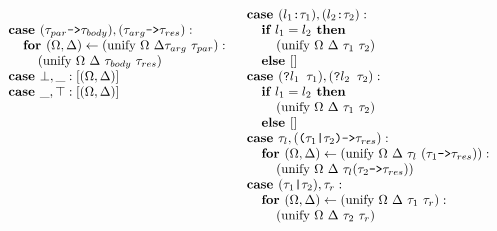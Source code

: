 \documentclass[acmsmall]{acmart}
\begin{document}
\begin{figure*}[h]
\[\begin{array}[t]{@{} l}
    \\

    \I \B{case } (\code{$\tau_{par}$->$\tau_{body}$}), (\code{$\tau_{arg}$->$\tau_{res}$}) : 
    \\
    \I\I \B{for } (\Omega, \Delta) \leftarrow (\F{unify } \Omega\ \Delta \tau_{arg}\ \tau_{par} ):
    \\
    \I\I\I (\F{unify } \Omega\ \Delta\ \tau_{body}\ \tau_{res})

    \\

    \I \B{case } \bot, \_ : [(\Omega, \Delta)]

    \\

    \I \B{case } \_, \top : [(\Omega, \Delta)]
\end{array}
\begin{array}[t]{@{} l}
    \I \B{case } (\code{$l_1$:$\tau_1$}), (\code{$l_2$:$\tau_2$}) :
    \\
    \I\I \B{if } l_1 = l_2 \B{ then }
    \\
    \I\I\I (\F{unify } \Omega\ \Delta\ \tau_1\ \tau_2)
    \\
    \I\I \B{else } []

    \\

    \I \B{case } (\code{?$l_1$ $\tau_1$}), (\code{?$l_2$ $\tau_2$}) :
    \\
    \I\I \B{if } l_1 = l_2 \B{ then }
    \\
    \I\I\I (\F{unify } \Omega\ \Delta\ \tau_1\ \tau_2)
    \\
    \I\I \B{else } []

    \\

    \I \B{case } \tau_l, (\code{($\tau_1$|$\tau_2$)->$\tau_{res}$}) : 
    \\
    \I\I \B{for } (\Omega, \Delta) \leftarrow (\F{unify } \Omega\ \Delta\ \tau_l\ (\code{$\tau_1$->$\tau_{res}$})):
    \\
    \I\I\I (\F{unify } \Omega\ \Delta\ \tau_l (\code{$\tau_2$->$\tau_{res}$})) 

    \\

    \I \B{case } (\code{$\tau_1$|$\tau_2$}), \tau_r : 
    \\
    \I\I \B{for } (\Omega, \Delta) \leftarrow (\F{unify } \Omega\ \Delta\ \tau_1\ \tau_r):
    \\
    \I\I\I (\F{unify } \Omega\ \Delta\ \tau_2\ \tau_r) 


\end{array}\]
\end{figure*}
\end{document}

